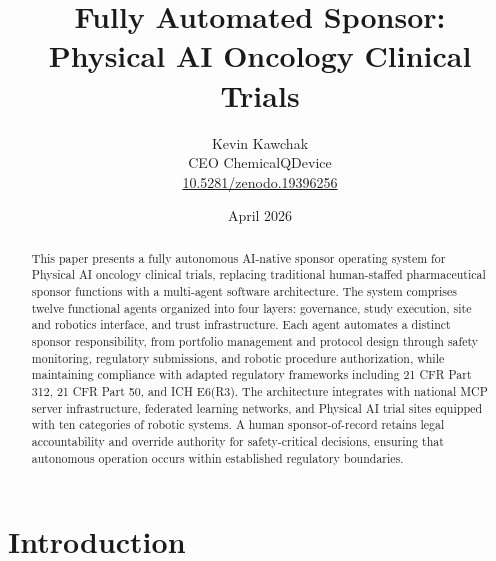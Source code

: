 \documentclass{article}
\title{Fully Automated Sponsor:\\Physical AI Oncology Clinical Trials}
\author{
  Kevin Kawchak\hspace{2pt}\orcidicon{0009-0007-5457-8667} \\
  CEO ChemicalQDevice\\
  \href{https://doi.org/10.5281/zenodo.19396256}{10.5281/zenodo.19396256} \\
}
\date{April 2026}
\begin{document}
\maketitle

\begin{abstract}
This paper presents a fully autonomous AI-native sponsor operating system
for Physical AI oncology clinical trials, replacing traditional
human-staffed pharmaceutical sponsor functions with a multi-agent
software architecture. The system comprises twelve functional agents
organized into four layers: governance, study execution, site and
robotics interface, and trust infrastructure. Each agent automates a
distinct sponsor responsibility, from portfolio management and protocol
design through safety monitoring, regulatory submissions, and robotic
procedure authorization, while maintaining compliance with adapted
regulatory frameworks including 21 CFR Part 312, 21 CFR Part 50, and
ICH E6(R3). The architecture integrates with national MCP server
infrastructure, federated learning networks, and Physical AI trial
sites equipped with ten categories of robotic systems. A human
sponsor-of-record retains legal accountability and override authority
for safety-critical decisions, ensuring that autonomous operation occurs
within established regulatory boundaries.
\end{abstract}


\vspace{-0.2cm}

\section{Introduction}
\label{sec:introduction}


\newpage
\tableofcontents
\newpage

\end{document}
